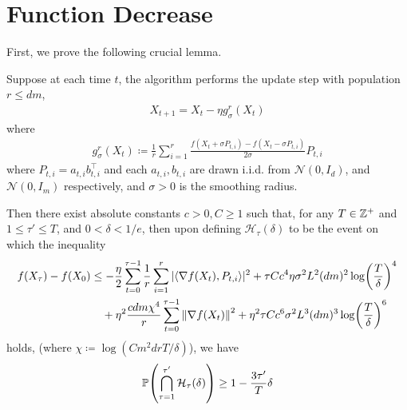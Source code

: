 \section{Function Decrease}
First, we prove the following crucial lemma.
\begin{lemma}\label{lem:symm-eggroll-function-decrease}
    Suppose at each time $t$, the algorithm performs the update step with population $r \leq dm$,
    \begin{align*}
        X_{t+1} = X_t - \eta g_\sigma^{r}(X_t)
    \end{align*}
    where
    \begin{align*}
        g_\sigma^{r}(X_t) \coloneqq \frac{1}{r} \sum_{i=1}^r \frac{f(X_t + \sigma P_{t,i}) - f(X_t - \sigma P_{t,i})}{2\sigma} P_{t,i}
    \end{align*}
    where $P_{t,i} = a_{t,i}b_{t,i}^\top$ and each $a_{t,i},b_{t,i}$ are drawn i.i.d. from $\mathcal N(0, I_d)$, and $\mathcal N(0, I_m)$ respectively, and $\sigma > 0$ is the smoothing radius.

    Then there exist absolute constants $c>0,C \geq 1$ such that, for any $T \in \bZ^+$ and $1 \leq \tau' \leq T$, and $0 < \delta < 1/e$, then upon defining $\mathcal H_{\tau}(\delta)$ to be the event on which the inequality 
    \begin{align*}
        f(X_{\tau}) - f(X_0) &\leq -\frac{\eta}{2} \sum_{t=0}^{\tau-1} \frac{1}{r} \sum_{i=1}^r |\langle \grad f(X_t), P_{t,i} \rangle|^2 + \tau C c^4 \eta \sigma^2 L^2(dm)^2 \log(\frac T\delta)^4 \\
    &\quad + \eta^2 \frac{cdm\chi^4}{r} \sum_{t=0}^{\tau-1} \mg{\grad f(X_t)}^2 + \eta^2 \tau C c^6  \sigma^2 L^3 (dm)^3 \log(\frac T \delta)^6
    \end{align*}
holds, (where $\chi \coloneqq \log(Cm^2 drT/\delta)$), we have 
\begin{align*}
    \P(\bigcap_{\tau=1}^{\tau'} \mathcal H_{\tau}(\delta)) \geq 1 - \frac{3\tau'}{T}\delta
\end{align*}
\end{lemma}
